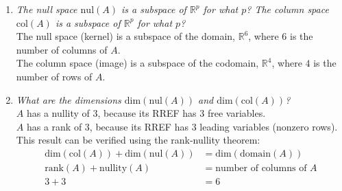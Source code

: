 \documentclass[12pt]{article}
\begin{document}
\begin{enumerate}[label=(\alph*)]
	\item \textit{The null space $\text{nul}(A)$ is a subspace of
	$\mathbb{R}^p$ for what $p$? The column space $\text{col}(A)$ is a
	subspace of $\mathbb{R}^p$ for what $p$?} \\[\baselineskip]
	The null space (kernel) is a subspace of the domain,
	$\boxed{\mathbb{R}^6}$, where $6$ is the number of columns of $A$. \\
	The column space (image) is a subspace of the codomain,
	$\boxed{\mathbb{R}^4}$, where $4$ is the number of rows of $A$.
	
	\item \textit{What are the dimensions $\text{dim}(\text{nul}(A))$ and
	$\text{dim}(\text{col}(A))$?} \\[\baselineskip]
	$A$ has a nullity of $\boxed{3}$, because its RREF has $3$ free variables.
	\\
	$A$ has a rank of $\boxed{3}$, because its RREF has $3$ leading variables
	(nonzero rows). \\
	This result can be verified using the rank-nullity theorem:
	\begin{align*}
		\text{dim}(\text{col}(A)) + \text{dim}(\text{nul}(A))
		&=
		\text{dim}(\text{domain}(A))
		\\
		\text{rank}(A) + \text{nullity}(A)
		&=
		\text{number of columns of } A
		\\
		3 + 3
		&=
		6
	\end{align*}
	

\end{enumerate}
\end{document}
